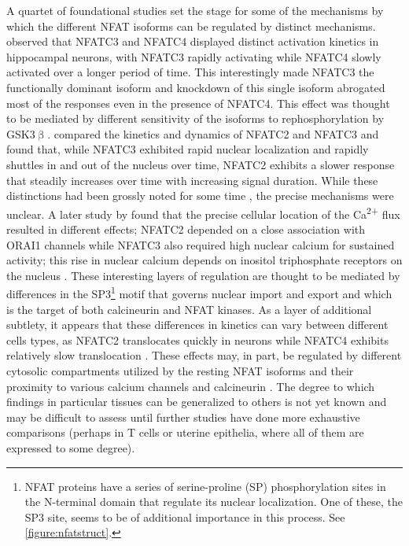 A quartet of foundational studies set the stage for some of the mechanisms by which the different NFAT isoforms can be regulated by distinct mechanisms. \citet{Ulrich2012} observed that NFATC3 and NFATC4 displayed distinct activation kinetics in hippocampal neurons, with NFATC3 rapidly activating while NFATC4 slowly activated over a longer period of time. This interestingly made NFATC3 the functionally dominant isoform and knockdown of this single isoform abrogated most of the responses even in the presence of NFATC4. This effect was thought to be mediated by different sensitivity of the isoforms to rephosphorylation by GSK3$\upbeta$. \citet{Yissachar2013} compared the kinetics and dynamics of NFATC2 and NFATC3 and found that, while NFATC3 exhibited rapid nuclear localization and rapidly shuttles in and out of the nucleus over time, NFATC2 exhibits a slower response that steadily increases over time with increasing signal duration. While these distinctions had been grossly noted for some time \citep{Chow1997, Rinne2009}, the precise mechanisms were unclear. A later study by \citet{Kar2015} found that the precise cellular location of the Ca\textsuperscript{2+} flux resulted in different effects; NFATC2 depended on a close association with ORAI1 channels while NFATC3 also required high nuclear calcium for sustained activity; this rise in nuclear calcium depends on inositol triphosphate receptors on the nucleus \citep{Kar2016}. These interesting layers of regulation are thought to be mediated by differences in the SP3\footnote{NFAT proteins have a series of serine\hyp{}proline (SP) phosphorylation sites in the N\hyp{}terminal domain that regulate its nuclear localization. One of these, the SP3 site, seems to be of additional importance in this process. See \autoref{figure:nfatstruct}.} motif that governs nuclear import and export and which is the target of both calcineurin and NFAT kinases. As a layer of additional subtlety, it appears that these differences in kinetics can vary between different cells types, as NFATC2 translocates quickly in neurons while NFATC4 exhibits relatively slow translocation \citep{Vihma2016}. These effects may, in part, be regulated by different cytosolic compartments utilized by the resting NFAT isoforms and their proximity to various calcium channels and calcineurin \citep{UlenginTalkish2022}. The degree to which findings in particular tissues can be generalized to others is not yet known and may be difficult to assess until further studies have done more exhaustive comparisons (perhaps in T cells or uterine epithelia, where all of them are expressed to some degree). 

